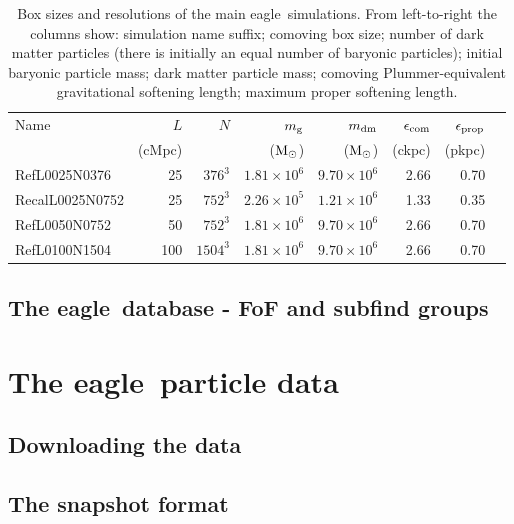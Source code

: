 \documentclass[10pt, a4paper]{article}
\newcommand{\eagle}{{\sc eagle}}
\newcommand{\Msun}{{\hbox{${\rm M}_\odot$}}}
\begin{document}
\begin{table}
\caption{Box sizes and resolutions of the main \eagle\ simulations.  From
left-to-right the columns show: simulation name suffix; comoving box size;
number of dark matter particles (there is initially an equal number of baryonic
particles); initial baryonic particle mass; dark matter particle mass;
comoving Plummer-equivalent gravitational softening length; maximum proper
softening length.} 
\label{table:sims}
 \begin{center}
\begin{tabular}{lrrrrrrr}
\hline
Name & $L$ & $N$ & $m_{\rm g}$ & $m_{\rm dm}$ &
$\epsilon_{\rm com}$ & $\epsilon_{\rm prop}$ \\  
& (cMpc) & & ($\Msun$) & ($\Msun$) & (ckpc) & (pkpc)\\
\hline 
{\sc Ref}L0025N0376 &  25 & $376^3$ & $1.81\times 10^6$ & $9.70\times 10^6$ & 2.66 &0.70\\
{\sc Recal}L0025N0752 &  25 & $752^3$ & $2.26\times 10^5$ & $1.21\times 10^6$ & 1.33 & 0.35\\
{\sc Ref}L0050N0752 &  50 & $752^3$ & $1.81\times 10^6$ & $9.70\times 10^6$ & 2.66 &0.70\\
{\sc Ref}L0100N1504 & 100 & $1504^3$ & $1.81\times 10^6$ & $9.70\times 10^6$ & 2.66 &0.70\\
\hline
\end{tabular}
\end{center}
\end{table}

\subsection{The \eagle\ database - FoF and {\sc subfind} groups}

\section{The \eagle\ particle data} \label{sect:eagle_pdata}
\subsection{Downloading the data}

\subsection{The snapshot format}
\end{document}
